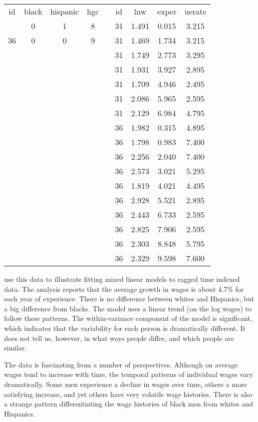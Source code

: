 \bigskip
\begin{center}
\begin{tabular}{cccc p{.5in} cccc} \cline{1-4} \cline{6-9}
\T \B id & black & hispanic & hgc & & id & lnw & exper & uerate\\ \cline{1-4}  \cline{6-9}
\T 31 & 0 & 1 & 8 & & 31 & 1.491 & 0.015 & 3.215\\
36 & 0 & 0 & 9 & & 31 & 1.469 & 1.734 & 3.215\\ \cline{1-4}
& & & & & 31 & 1.749 & 2.773 & 3.295\\
& & & & & 31 & 1.931 & 3.927 & 2.895\\
& & & & & 31 & 1.709 & 4.946 & 2.495\\
& & & & & 31 & 2.086 & 5.965 & 2.595\\
& & & & & 31 & 2.129 & 6.984 & 4.795\\
& & & & & 36 & 1.982 & 0.315 & 4.895\\
& & & & & 36 & 1.798 & 0.983 & 7.400\\
& & & & & 36 & 2.256 & 2.040 & 7.400\\
& & & & & 36 & 2.573 & 3.021 & 5.295\\
& & & & & 36 & 1.819 & 4.021 & 4.495\\
& & & & & 36 & 2.928 & 5.521 & 2.895\\
& & & & & 36 & 2.443 & 6.733 & 2.595\\
& & & & & 36 & 2.825 & 7.906 & 2.595\\
& & & & & 36 & 2.303 & 8.848 & 5.795\\
& & & & & 36 & 2.329 & 9.598 & 7.600\\ \cline{6-9}
\end{tabular}
\end{center}

\bigskip
{}  use this data to
illustrate fitting mixed linear models to ragged time indexed
data. The analysis reports that the average growth in wages is about
4.7\% for each year of experience. There is no difference between
whites and Hispanics, but a big difference from blacks. The model uses
a linear trend (on the log wages) to follow these patterns. The
within-variance component of the model is significant, which indicates
that the variability for each person is dramatically different. It
does not tell us, however, in what ways people differ, and which
people are similar.

The data is fascinating from a number of perspectives. Although on
average wages tend to increase with time, the temporal patterns of
individual wages vary dramatically. Some men experience a decline in
wages over time, others a more satisfying increase, and yet others
have very volatile wage histories. There is also a strange pattern
differentiating the wage histories of black men from whites and
Hispanics.

